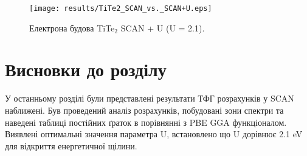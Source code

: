 \begin{figure}
	\texttt{[image: results/TiTe2\_SCAN\_vs.\_SCAN+U.eps]}
	\caption{Електрона будова TiTe$_2$ SCAN + U (U = 2.1).}\label{fig:SCAN+U_tite2}
\end{figure}

\section{Висновки до розділу}
У останньому розділі були представлені результати ТФГ розрахунків у SCAN наближені. Був проведений аналіз розрахунків, побудовані зони спектри та наведені таблиці постійних ґраток в порівнянні з PBE GGA функціоналом. Виявлені оптимальні значення параметра U, встановлено що U дорівнює 2.1 eV для відкриття енергетичної щілини. 